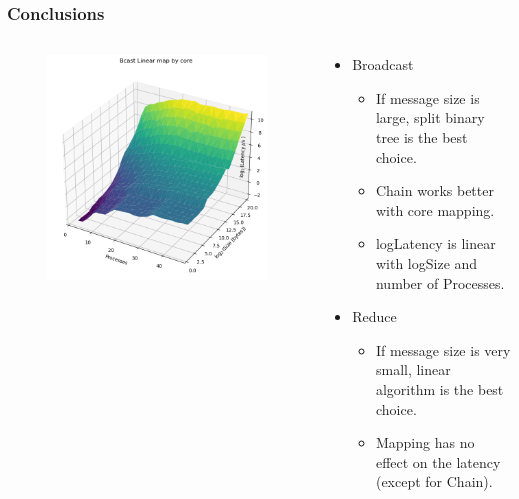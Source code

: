 \documentclass{beamer}
\begin{document}
\begin{frame}
    \frametitle{Conclusions}

    \begin{columns}[T]
        
        \begin{column}{0.5\textwidth}
            \begin{figure}
                \centering
                \includegraphics[width=\textwidth]{../plots/bcast_linear_core_3d.png}
            \end{figure}
        \end{column}

        \begin{column}{0.6\textwidth}
            \begin{itemize}
                \item Broadcast
                    \begin{itemize}
                        \item If message size is large, split binary tree is the best choice.
                        \item Chain works better with core mapping.
                        \item logLatency is linear with logSize and number of Processes.
                    \end{itemize}
                \item Reduce
                    \begin{itemize}
                        \item If message size is very small, linear algorithm is the best choice.
                        \item Mapping has no effect on the latency (except for Chain).
                    \end{itemize}
            \end{itemize}
        \end{column}

    \end{columns}

\end{frame}
\end{document}
